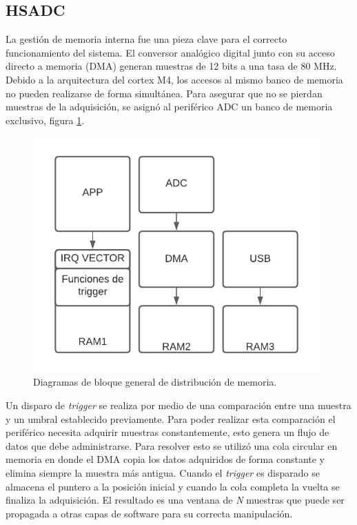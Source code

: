 \newpage

\subsection{HSADC}

La gestión de memoria interna fue una pieza clave para el correcto funcionamiento del sistema. El conversor analógico digital junto con su acceso directo a memoria (DMA) generan muestras de 12 bits a una tasa de 80 MHz. Debido a la arquitectura del cortex M4, los accesos al mismo banco de memoria no pueden realizarse de forma simultánea. Para asegurar que no se pierdan muestras de la adquisición, se asignó al periférico ADC un banco de memoria exclusivo, figura \ref{fig:firmMemoria}.

\begin{figure}[ht]
	\centering
	\includegraphics[width=110mm]{./Figures/firmMemoria.png}
	\caption{Diagramas de bloque general de distribución de memoria.}
	\label{fig:firmMemoria}
\end{figure}

Un disparo de \textit{trigger} se realiza por medio de una comparación entre una muestra y un umbral establecido previamente. Para poder realizar esta comparación el periférico necesita adquirir muestras constantemente, esto genera un flujo de datos que debe administrarse. Para resolver esto se utilizó una cola circular en memoria en donde el DMA copia los datos adquiridos de forma constante y elimina siempre la muestra más antigua. Cuando el \textit{trigger} es disparado se almacena el puntero a la posición inicial y cuando la cola completa la vuelta se finaliza la adquisición. El resultado es una ventana de \textit{N} muestras que puede ser propagada a otras capas de software para su correcta manipulación. 

